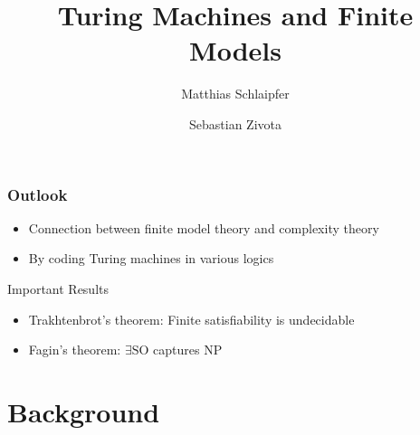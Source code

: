 \documentclass{beamer}
\title{Turing Machines and Finite Models}
\author{Matthias Schlaipfer \and Sebastian Zivota}
\newcommand{\SO}{\ensuremath{\mathrm{SO}}}
\begin{document}
\begin{frame}[plain]
	\titlepage
\end{frame}


\begin{frame}
  \frametitle{Outlook}
  \begin{itemize}
    \item Connection between finite model theory and complexity theory
    \item By coding Turing machines in various logics
  \end{itemize}
  \vspace{2em} 
  \begin{alertblock}{Important Results}
  \begin{itemize}
    \item Trakhtenbrot's theorem: Finite satisfiability is undecidable
    \item Fagin's theorem: $\exists \SO$ captures $\mathrm{NP}$
  \end{itemize}
  \end{alertblock}
\end{frame}

\section{Background}
\end{document}
